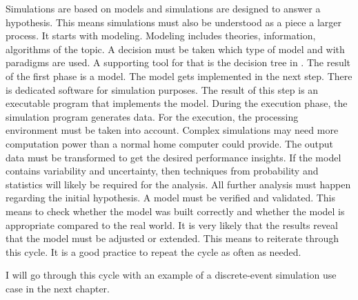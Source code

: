 Simulations are based on models and simulations are designed to answer a hypothesis. This means simulations must also be understood as a piece a larger process.
It starts with modeling. Modeling includes theories, information, algorithms of the topic. A decision must be taken which type of model and with paradigms are used. A supporting tool for that is the decision tree in .
The result of the first phase is a model. The model gets implemented in the next step. There is dedicated software for simulation purposes. \cite{wiki:deslist} The result of this step is an executable program that implements the model.
During the execution phase, the simulation program generates data. For the execution, the processing environment must be taken into account. Complex simulations may need more computation power than a normal home computer could provide.
The output data must be transformed to get the desired performance insights.
If the model contains variability and uncertainty, then techniques from probability
and statistics will likely be required for the analysis. All further analysis must happen regarding the initial hypothesis. A model must be verified and validated. This means to check whether the model was built correctly and whether the model is appropriate compared to the real world.
 It is very likely that the results reveal that the model must be adjusted or extended. This means to reiterate through this cycle. It is a good practice to repeat the cycle as often as needed.

I will go through this cycle with an example of a discrete-event simulation use case in the next chapter.


